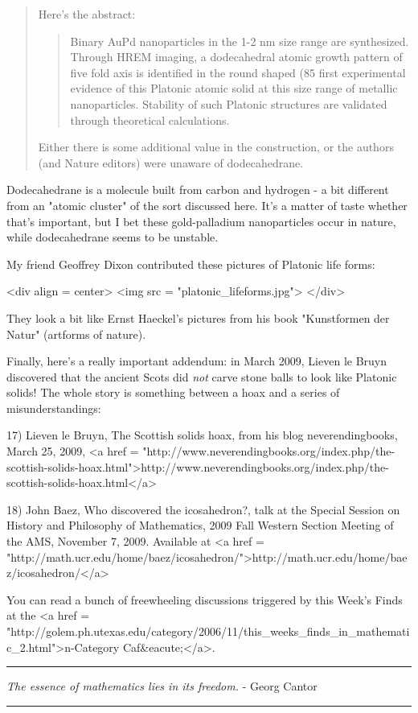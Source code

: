 \begin{quote}
Here's the abstract: 

\begin{quote}
Binary AuPd nanoparticles in the 1-2 nm size range are synthesized. Through
HREM imaging, a dodecahedral atomic growth pattern of five fold axis is
identified in the round shaped (85%
first experimental evidence of this Platonic atomic solid at this size range
of metallic nanoparticles. Stability of such Platonic structures are
validated through theoretical calculations.
\end{quote}

Either there is some additional value in the construction, or the authors
(and Nature editors) were unaware of dodecahedrane.
\end{quote}

Dodecahedrane is a molecule built from carbon and hydrogen - a bit
different from an "atomic cluster" of the sort discussed
here.  It's a matter of taste whether that's important, but I bet
these gold-palladium nanoparticles occur in nature, while dodecahedrane
seems to be unstable.

My friend Geoffrey Dixon contributed these pictures of Platonic
life forms:

<div align = center>
<img src = "platonic_lifeforms.jpg">
</div>

They look a bit like Ernst Haeckel's pictures from his book
"Kunstformen der Natur" (artforms of nature).

Finally, here's a really important addendum: in March 2009, Lieven le
Bruyn discovered that the ancient Scots did \emph{not} carve stone
balls to look like Platonic solids!  The whole story is something
between a hoax and a series of misunderstandings:

17) Lieven le Bruyn, The Scottish solids hoax, from his blog
neverendingbooks, March 25, 2009,
<a href = "http://www.neverendingbooks.org/index.php/the-scottish-solids-hoax.html">http://www.neverendingbooks.org/index.php/the-scottish-solids-hoax.html</a>

18) John Baez, Who discovered the icosahedron?, talk at the Special
Session on History and Philosophy of Mathematics, 2009 Fall Western
Section Meeting of the AMS, November 7, 2009.  Available at
<a href = "http://math.ucr.edu/home/baez/icosahedron/">http://math.ucr.edu/home/baez/icosahedron/</a>

You can read a bunch of freewheeling discussions triggered by
this Week's Finds at the <a href = "http://golem.ph.utexas.edu/category/2006/11/this_weeks_finds_in_mathematic_2.html">n-Category Caf&eacute;</a>.

\par\noindent\rule{\textwidth}{0.4pt}
\emph{The essence of mathematics lies in its freedom.} - Georg Cantor

\par\noindent\rule{\textwidth}{0.4pt}

